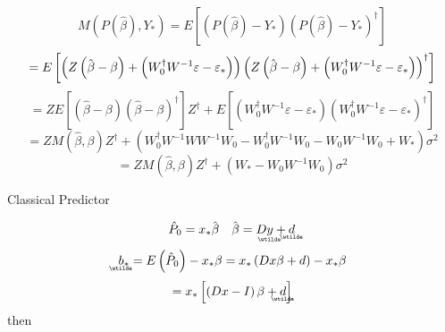 \documentclass{article}
\begin{document}
\begin{equation*}
M\left( P\left( \hat{\beta}\right) ,Y_{\ast }\right) =E\left[ \left( P\left( 
\hat{\beta}\right) -Y_{\ast }\right) \left( P\left( \hat{\beta}\right)
-Y_{\ast }\right) ^{\dagger }\right]
\end{equation*}%
\begin{equation*}
=E\left[ \left( Z\left( \hat{\beta}-\beta \right) +\left( W_{0}^{\dagger
}W^{-1}\varepsilon -\varepsilon _{\ast }\right) \right) \left( Z\left( \hat{%
\beta}-\beta \right) +\left( W_{0}^{\dagger }W^{-1}\varepsilon -\varepsilon
_{\ast }\right) \right) ^{\dagger }\right]
\end{equation*}%
\begin{equation*}
=ZE\left[ \left( \hat{\beta}-\beta \right) \left( \hat{\beta}-\beta \right)
^{\dagger }\right] Z^{\dagger }+E\left[ \left( W_{0}^{\dagger
}W^{-1}\varepsilon -\varepsilon _{\ast }\right) \left( W_{0}^{\dagger
}W^{-1}\varepsilon -\varepsilon _{\ast }\right) ^{\dagger }\right]
\end{equation*}%
\begin{equation*}
=ZM\left( \hat{\beta},\beta \right) Z^{\dagger }+\left( W_{0}^{\dagger
}W^{-1}WW^{-1}W_{0}-W_{0}^{\dagger }W^{-1}W_{0}-W_{0}W^{-1}W_{0}+W_{\ast
}\right) \sigma ^{2}
\end{equation*}%
\begin{equation*}
=ZM\left( \hat{\beta},\beta \right) Z^{\dagger }+\left( W_{\ast
}-W_{0}W^{-1}W_{0}\right) \sigma ^{2}
\end{equation*}

\bigskip

Classical Predictor

\begin{equation*}
\hat{P}_{0}=x_{\ast }\hat{\beta}\quad \hat{\beta}=D%
\underaccent{\wtilde}{y}%
+%
\underaccent{\wtilde}{d}%
\end{equation*}%
\begin{equation*}
\underaccent{\wtilde}{b}%
_{\ast }=E\left( \hat{P}_{0}\right) -x_{\ast }\beta =x_{\ast }\left( Dx\beta
+d\right) -x_{\ast }\beta
\end{equation*}%
\begin{equation*}
=x_{\ast }\left[ \left( Dx-I\right) \beta +%
\underaccent{\wtilde}{d}%
\right]
\end{equation*}%
then
\end{document}
